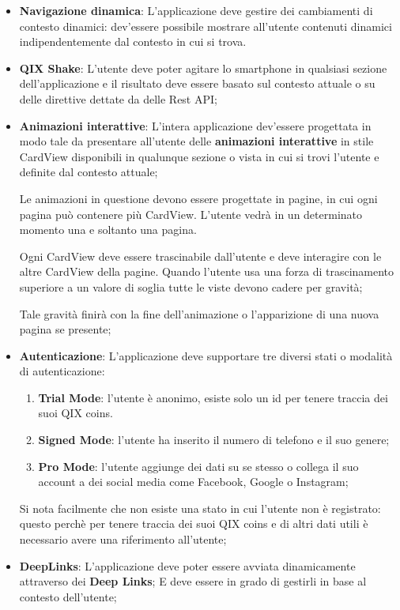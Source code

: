 \begin{itemize}
    \item {
        \textbf{Navigazione dinamica}: L'applicazione deve gestire dei cambiamenti di contesto
        dinamici: dev'essere possibile mostrare all'utente contenuti dinamici indipendentemente
        dal contesto in cui si trova. 
    }
    \item {
        \textbf{QIX Shake}: L'utente deve poter agitare lo smartphone in qualsiasi
        sezione dell'applicazione e il risultato deve essere basato sul contesto attuale o su delle direttive dettate
        da delle Rest API;
    } 
    \item {
        \textbf{Animazioni interattive}: L'intera applicazione dev'essere progettata in modo tale da presentare all'utente
        delle \textbf{animazioni interattive} in stile CardView\cite{cardview} disponibili in 
        qualunque sezione o vista in cui si trovi l'utente e definite dal contesto attuale;

        Le animazioni in questione devono essere progettate in pagine, in cui ogni pagina può contenere 
        più CardView. L'utente vedrà in un determinato momento una e soltanto una pagina.

        Ogni CardView deve essere trascinabile dall'utente e deve interagire con le altre CardView della pagine. 
        Quando l'utente usa una forza di trascinamento superiore a un valore di soglia tutte le viste devono
        cadere per gravità;
        
        Tale gravità finirà con la fine dell'animazione o l'apparizione di una nuova pagina se presente;
    }
    \item {
        \textbf{Autenticazione}: L'applicazione deve supportare tre diversi stati o modalità di autenticazione:
        \begin{enumerate}
            \item\textbf{Trial Mode}: l'utente è anonimo, esiste solo un id per tenere traccia dei suoi QIX coins.
            \item\textbf{Signed Mode}: l'utente ha inserito il numero di telefono e il suo genere;
            \item \textbf{Pro Mode}: l'utente aggiunge dei dati su se stesso o collega il suo account a dei social media come Facebook, Google o Instagram;
        \end{enumerate}
        Si nota facilmente che non esiste una stato in cui l'utente non è registrato: questo perchè
        per tenere traccia dei suoi QIX coins e di altri dati utili è necessario avere una riferimento all'utente;
    }
    \item {
        \textbf{DeepLinks}: L'applicazione deve poter essere avviata dinamicamente
        attraverso dei \textbf{Deep Links}\cite{deeplinks};
        E deve essere in grado di gestirli in base al contesto dell'utente;
    }
\end{itemize}

